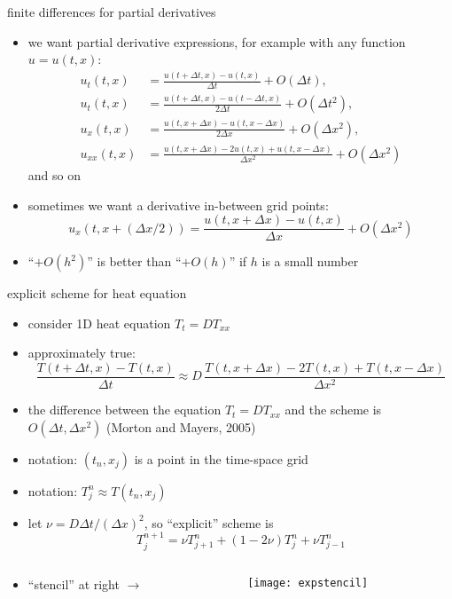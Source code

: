 \begin{frame}{finite differences for partial derivatives}

\begin{itemize}
\item we want partial derivative expressions, for example with any function $u=u(t,x)$:
\small
\begin{align*}
u_t(t,x) &= \frac{u(t+\Delta t,x) - u(t,x)}{\Delta t} + O(\Delta t), \\
u_t(t,x) &= \frac{u(t+\Delta t,x) - u(t-\Delta t,x)}{2\Delta t} + O(\Delta t^2), \\
u_x(t,x) &= \frac{u(t,x+\Delta x) - u(t,x-\Delta x)}{2\Delta x} + O(\Delta x^2), \\
u_{xx}(t,x) &= \frac{u(t,x+\Delta x) - 2 u(t,x) + u(t,x-\Delta x)}{\Delta x^2} + O(\Delta x^2)
\end{align*}
\normalsize
and so on
\item sometimes we want a derivative in-between grid points:
\small
	$$u_x(t,x+(\Delta x/2)) = \frac{u(t,x+\Delta x) - u(t,x)}{\Delta x} + O(\Delta x^2)$$
\normalsize
\item ``$+O(h^2)$'' is better than ``$+O(h)$'' if $h$ is a small number
\end{itemize}
\end{frame}


\begin{frame}{explicit scheme for heat equation}
\label{slide:explicit}

\begin{itemize}
\item consider 1D heat equation $T_t = D T_{xx}$
\item approximately true:
\small
	$$\frac{T(t+\Delta t,x) - T(t,x)}{\Delta t} \approx D\,\frac{T(t,x+\Delta x) - 2 T(t,x) + T(t,x-\Delta x)}{\Delta x^2}$$
\normalsize
\item the difference between the equation $T_t = D T_{xx}$ and the scheme is $O(\Delta t,\Delta x^2)$ (Morton and Mayers, 2005)
\item notation: $(t_n,x_j)$ is a point in the time-space grid
\item notation: $T_j^n \approx T(t_n,x_j)$  
\item let $\nu = D \Delta t / (\Delta x)^2$, so ``explicit'' scheme is
\small
	$$T_j^{n+1} = \nu T_{j+1}^n + (1 - 2 \nu) T_j^n + \nu T_{j-1}^n$$
\normalsize
\end{itemize}
\begin{columns}
\begin{column}{0.55\textwidth}
\begin{itemize}
\item ``stencil'' at right \large $\to$ \normalsize
\end{itemize}
\end{column}
\begin{column}{0.45\textwidth}
\texttt{[image: expstencil]}
\end{column}
\end{columns}
\end{frame}


